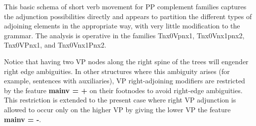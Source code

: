 This basic schema of short verb movement for PP complement families
captures the adjunction possibilities directly and appears to partition
the different types of adjoining elements in the appropriate way, with
very little modification to the grammar. The analysis is operative
in the families Tnx0Vpnx1, Tnx0Vnx1pnx2, Tnx0VPnx1, and Tnx0Vnx1Pnx2.

Notice that having two VP nodes along the right spine of the trees will
engender right edge ambiguities. In other structures where this ambiguity
arises (for example, sentences with auxiliaries), VP right-adjoining modifiers
are restricted by the feature {\bf mainv = +} on their footnodes to avoid
right-edge ambiguities. This restriction is extended to the present case where
right VP adjunction is allowed to occur only on the higher VP by giving the
lower VP the feature {\bf mainv = -}.
